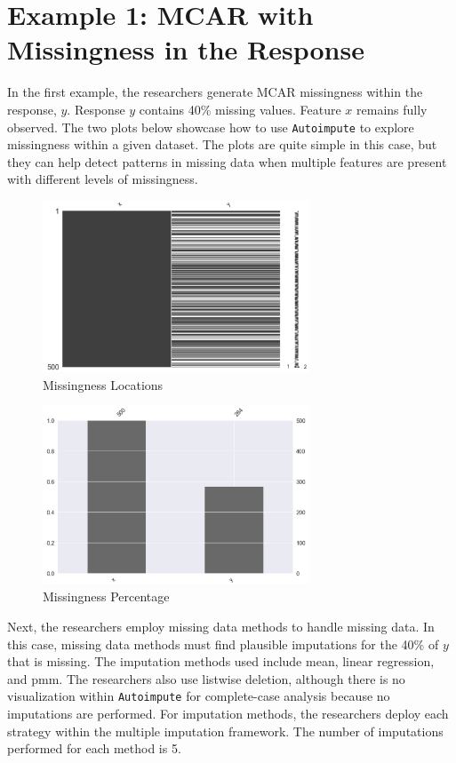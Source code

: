 \documentclass[12pt,oneside]{chicagocapstone}
\begin{document}
\section*{Example 1: MCAR with Missingness in the
Response}\label{example-1-mcar-with-missingness-in-the-response}

In the first example, the researchers generate MCAR missingness within
the response, \(y\). Response \(y\) contains 40\% missing values.
Feature \(x\) remains fully observed. The two plots below showcase how
to use \texttt{Autoimpute} to explore missingness within a given
dataset. The plots are quite simple in this case, but they can help
detect patterns in missing data when multiple features are present with
different levels of missingness.
\begin{figure}

{\centering \includegraphics[width=300px]{figure/y-mis-forty-loc} 

}

\caption{Missingness Locations}\label{fig:y-mis-forty-loc}
\end{figure}
\begin{figure}

{\centering \includegraphics[width=300px]{figure/y-mis-forty-bar} 

}

\caption{Missingness Percentage}\label{fig:y-mis-forty-bar}
\end{figure}
Next, the researchers employ missing data methods to handle missing
data. In this case, missing data methods must find plausible imputations
for the 40\% of \(y\) that is missing. The imputation methods used
include mean, linear regression, and pmm. The researchers also use
listwise deletion, although there is no visualization within
\texttt{Autoimpute} for complete-case analysis because no imputations
are performed. For imputation methods, the researchers deploy each
strategy within the multiple imputation framework. The number of
imputations performed for each method is 5.
\end{document}
